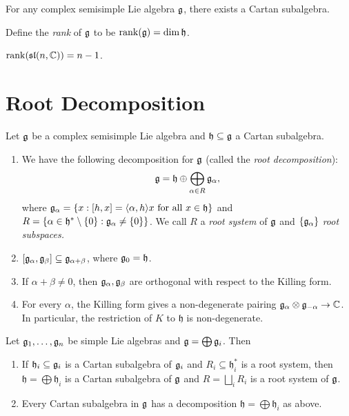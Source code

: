 \begin{corollary}
  For any complex semisimple Lie
  algebra $\mathfrak{g}$, there exists a
  Cartan subalgebra.
\end{corollary}

\begin{definition}
  Define the \emph{rank} of $\mathfrak{g}$
  to be $\operatorname{rank}(\mathfrak{g}) = \dim \mathfrak{h}$.
\end{definition}

\begin{example}
  $\operatorname{rank}(\mathfrak{sl}(n, \mathbb{C})) = n - 1$.
\end{example}

\section{Root Decomposition}

\begin{theorem}
  Let $\mathfrak{g}$ be a complex semisimple Lie algebra
  and $\mathfrak{h} \subseteq \mathfrak{g}$ a Cartan subalgebra.
  \begin{enumerate}
    \item We have the following decomposition
      for $\mathfrak{g}$
      (called the \emph{root decomposition}):
      \[
        \mathfrak{g} = \mathfrak{h} \oplus
        \bigoplus_{\alpha \in R} \mathfrak{g}_\alpha,
      \]
      where $\mathfrak{g}_\alpha = \{x : [h, x] = \langle \alpha, h \rangle x \text{ for all } x \in \mathfrak{h}\}$
      and $R = \{\alpha \in \mathfrak{h}^* \setminus \{0\} : \mathfrak{g}_\alpha \ne \{0\}\}$.
      We call $R$ a \emph{root system} of
      $\mathfrak{g}$ and $\{\mathfrak{g}_\alpha\}$
      \emph{root subspaces.}
    \item $[\mathfrak{g}_\alpha, \mathfrak{g}_\beta] \subseteq \mathfrak{g}_{\alpha + \beta}$,
      where $\mathfrak{g}_0 = \mathfrak{h}$.
    \item If $\alpha + \beta \ne 0$,
      then $\mathfrak{g}_\alpha, \mathfrak{g}_\beta$ are
      orthogonal with respect to the
      Killing form.
    \item For every $\alpha$, the
      Killing form gives a non-degenerate
      pairing $\mathfrak{g}_\alpha \otimes \mathfrak{g}_{-\alpha} \to \mathbb{C}$.
      In particular, the restriction of
      $K$ to $\mathfrak{h}$ is
      non-degenerate.
  \end{enumerate}
\end{theorem}

\begin{theorem}
  Let $\mathfrak{g}_1, \dots, \mathfrak{g}_n$ be simple
  Lie algebras and $\mathfrak{g} = \bigoplus \mathfrak{g}_i$. Then
  \begin{enumerate}
    \item If $\mathfrak{h}_i \subseteq \mathfrak{g}_i$
      is a Cartan subalgebra of $\mathfrak{g}_i$
      and $R_i \subseteq \mathfrak{h}_i^*$
      is a root system, then
      $\mathfrak{h} = \bigoplus \mathfrak{h}_i$
      is a Cartan subalgebra of $\mathfrak{g}$ 
      and $R = \bigsqcup_i R_i$ is a
      root system of $\mathfrak{g}$.
    \item Every Cartan subalgebra in $\mathfrak{g}$
      has a decomposition
      $\mathfrak{h} = \bigoplus \mathfrak{h}_i$
      as above.
  \end{enumerate}
\end{theorem}

